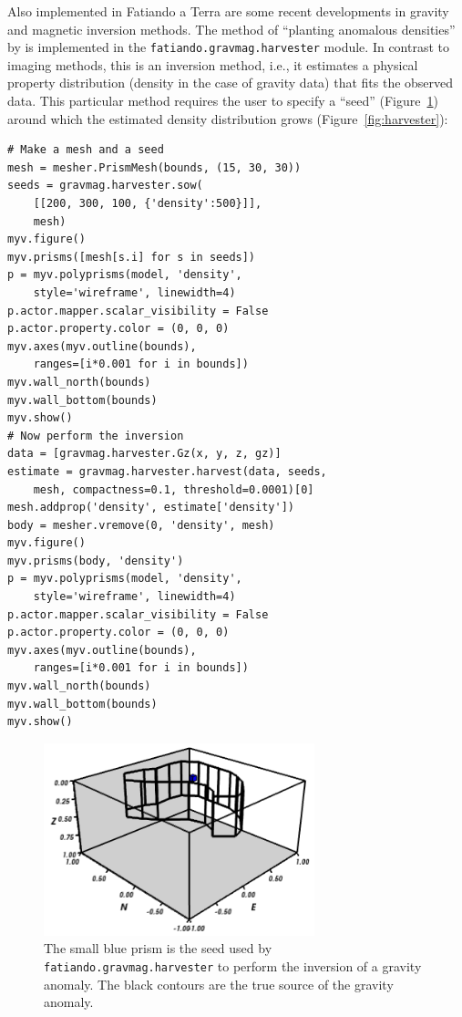 Also implemented in Fatiando a Terra are some recent developments in
gravity and magnetic inversion methods. The method of ``planting
anomalous densities'' by \citet{uieda2012} is implemented in the
\texttt{fatiando.gravmag.harvester} module. In contrast to imaging
methods, this is an inversion method, i.e., it estimates a physical
property distribution (density in the case of gravity data) that fits
the observed data. This particular method requires the user to specify a
``seed'' (Figure~\ref{fig:seed}) around which the estimated density
distribution grows (Figure~\ref{fig:harvester}):

\begin{verbatim}
# Make a mesh and a seed
mesh = mesher.PrismMesh(bounds, (15, 30, 30))
seeds = gravmag.harvester.sow(
    [[200, 300, 100, {'density':500}]],
    mesh)
myv.figure()
myv.prisms([mesh[s.i] for s in seeds])
p = myv.polyprisms(model, 'density',
    style='wireframe', linewidth=4)
p.actor.mapper.scalar_visibility = False
p.actor.property.color = (0, 0, 0)
myv.axes(myv.outline(bounds),
    ranges=[i*0.001 for i in bounds])
myv.wall_north(bounds)
myv.wall_bottom(bounds)
myv.show()
# Now perform the inversion
data = [gravmag.harvester.Gz(x, y, z, gz)]
estimate = gravmag.harvester.harvest(data, seeds,
    mesh, compactness=0.1, threshold=0.0001)[0]
mesh.addprop('density', estimate['density'])
body = mesher.vremove(0, 'density', mesh)
myv.figure()
myv.prisms(body, 'density')
p = myv.polyprisms(model, 'density',
    style='wireframe', linewidth=4)
p.actor.mapper.scalar_visibility = False
p.actor.property.color = (0, 0, 0)
myv.axes(myv.outline(bounds),
    ranges=[i*0.001 for i in bounds])
myv.wall_north(bounds)
myv.wall_bottom(bounds)
myv.show()
\end{verbatim}

\begin{figure}
    \centering
    \includegraphics[width=0.7\textwidth]{figures/paper1/gravmag_harvester_seed}
    \caption{
        The small blue prism is the seed used by
        \texttt{fatiando.gravmag.harvester} to perform the inversion of a
        gravity anomaly. The black contours are the true source of the gravity
        anomaly.
    }
    \label{fig:seed}
\end{figure}

